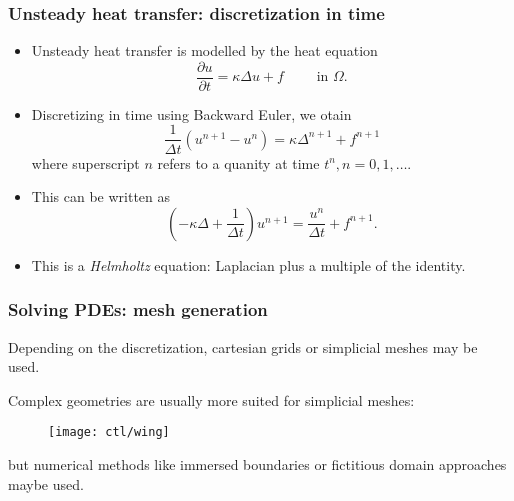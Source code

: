 \begin{frame}
  \frametitle{Unsteady heat transfer: discretization in time}
  \begin{itemize}
  \item Unsteady heat transfer is modelled by the heat equation
    \[
      \frac{\partial u}{\partial t} = \kappa\Delta u + f \qquad \text{ in } \Omega.
    \]
  \item Discretizing in time using Backward Euler, we otain
    \[
      \frac{1}{\Delta t} (u^{n+1}-u^n) = \kappa\Delta^{n+1}+f^{n+1}
    \]
    where superscript $n$ refers to a quanity at time $t^n, n=0,1,\ldots$.
  \item This can be written as
    \[
      \left(-\kappa\Delta + \frac{1}{\Delta t}\right)u^{n+1} = \frac{u^n}{\Delta t}+f^{n+1}.
    \]
  \item This is a \emph{Helmholtz} equation: Laplacian plus a multiple of the
    identity.
  \end{itemize}
\end{frame}

\begin{frame}
  \frametitle{Solving PDEs: mesh generation}

Depending on the discretization, cartesian grids or simplicial meshes may be used.

\medskip
Complex geometries are usually more suited for simplicial meshes:
\begin{figure}[hbt]
  \centering
  \texttt{[image: ctl/wing]}
\end{figure}
but numerical methods like immersed boundaries or fictitious domain approaches maybe used.

\end{frame}

